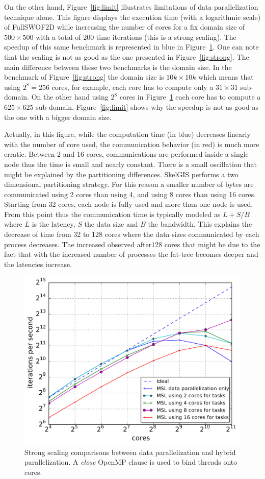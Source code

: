 On the other hand, Figure~\ref{fig:limit} illustrates limitations of data parallelization technique alone. This figure displays the execution time (with a logarithmic scale) of FullSWOF2D while increasing the number of cores for a fix domain size of $500 \times 500$ with a total of $200$ time iterations (\ie this is a strong scaling). The speedup of this same benchmark is represented in blue in Figure~\ref{fig:close}. One can note that the scaling is not as good as the one presented in Figure~\ref{fig:strong}. 
The main difference between these two benchmarks is the domain size. In the benchmark of Figure~\ref{fig:strong} the domain size is $10k \times 10k$ which means that using $2^8 = 256$ cores, for example, each core has to compute only a $31 \times 31$ sub-domain. On the other hand using $2^8$ cores in Figure~\ref{fig:close} each core has to compute a $625 \times 625$ sub-domain. Figure~\ref{fig:limit} shows why the speedup is not as good as the one with a bigger domain size.  

Actually, in this figure, while the computation time (in blue) decreases linearly with the number of core used, the communication behavior (in red) is much more erratic. Between 2 and 16 cores, communications are performed inside a single node thus the time is small and nearly constant. There is a small oscillation that might be explained by the partitioning differences. SkelGIS performs a two dimensional partitioning strategy. For this reason a smaller number of bytes are communicated using 2 cores than using 4, and using 8 cores than using 16 cores. Starting from 32 cores, each node is fully used and more than one node is used. From this point thus the communication time is typically modeled as $L+S/B$ where $L$ is the latency, $S$ the data size and $B$ the bandwidth. This explains the decrease of time from 32 to 128 cores where the data sizes communicated by each process decreases. The increased observed after$128$ cores that might be due to the fact that with the increased number of processes the fat-tree becomes deeper and the latencies increase.

\begin{figure}[th]\begin{center}
  \includegraphics[width=.6\textwidth]{../results/task_scaling/500_200/base_close_median.pdf}
  \caption{Strong scaling comparisons between data parallelization and hybrid parallelization. A \emph{close} OpenMP clause is used to bind threads onto cores.}
  \label{fig:close}
\end{center}\end{figure}


